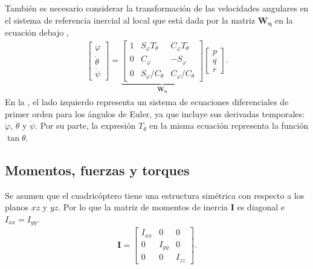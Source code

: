 También es necesario considerar la transformación de las velocidades angulares en el sistema de referencia inercial al local que está dada por la matriz $\mathbf{W}_{\bm{\eta}}$ en la ecuación debajo \cite{capella2020clase},
\begin{align}
\begin{bmatrix}
    \dot{\varphi} \\
    \dot{\theta}\\
    \dot{\psi} 
\end{bmatrix}
=
\underbrace{\begin{bmatrix}
    1 & S_{\varphi}T_{\theta} & C_{\varphi}T_{\theta} \\
    0 & C_{\varphi} & -S_{\varphi} \\
    0 & S_{\varphi}/C_{\theta}& C_{\varphi}/C_{\theta}
\end{bmatrix}}_{\mathbf{W}_{\bm{\eta}}}
\begin{bmatrix}
    p \\
    q\\
    r 
\end{bmatrix}.
\label{eq:W_eta}
\end{align}
En la , el lado izquierdo representa un sistema de ecuaciones diferenciales de primer orden para los ángulos de Euler, ya que incluye sus derivadas temporales: $\dot{\varphi}$, $\dot{\theta}$ y $\dot{\psi}$. Por su parte, la expresión $T_{\theta}$ en la misma ecuación representa la función $\tan\theta$.

\subsection{Momentos, fuerzas y torques}
Se asumen que el cuadricóptero tiene una estructura simétrica con respecto a los planos $xz$ y $yz$. Por lo que la matriz de momentos de inercia $\mathbf{I}$ es diagonal e $I_{xx} = I_{yy}$. \cite{capella2020clase}
\begin{align}
\mathbf{I} = 
\begin{bmatrix}
    I_{xx} & 0 & 0 \\
    0 & I_{yy} & 0 \\ 
    0 & 0 & I_{zz}
\end{bmatrix}.
\label{eq:inertia_matrix}
\end{align}

